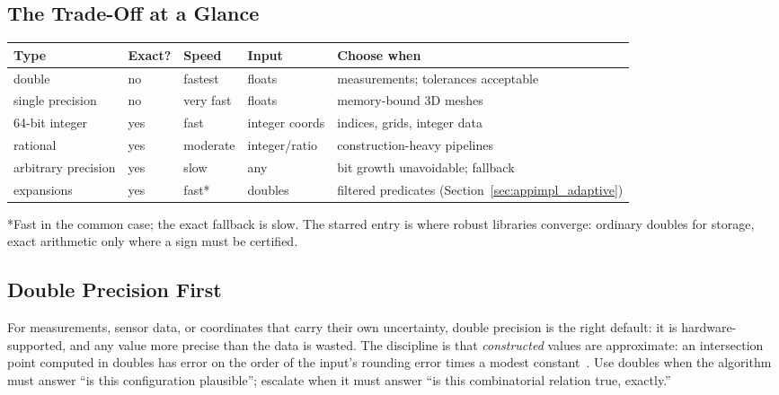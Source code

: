 \subsection{The Trade-Off at a Glance}
\label{sec:appimpl_representations}
\begin{center}
\begin{tabular}{p{3.2cm}p{2.2cm}p{2.2cm}p{3.0cm}p{4.0cm}}
\hline
\textbf{Type} & \textbf{Exact?} & \textbf{Speed} & \textbf{Input} & \textbf{Choose when} \\
\hline
\index{double precision}double & no & fastest & floats &
measurements; tolerances acceptable \\
single precision & no & very fast & floats & memory-bound 3D meshes \\
64-bit integer & yes & fast & integer coords & indices, grids, integer
data \\
\index{rational arithmetic}rational & yes & moderate & integer/ratio &
construction-heavy pipelines \\
arbitrary precision & yes & slow & any & bit growth unavoidable; fallback \\
\index{expansion arithmetic}expansions & yes & fast* & doubles &
filtered predicates (Section~\ref{sec:appimpl_adaptive}) \\
\hline
\end{tabular}
\end{center}

*Fast in the common case; the exact fallback is slow. The starred entry is
where robust libraries converge: ordinary doubles for storage, exact
arithmetic only where a sign must be certified.
\subsection{Double Precision First}
\label{sec:appimpl_double}
For measurements, sensor data, or coordinates that carry their own
uncertainty, double precision is the right default:
it is hardware-supported, and any value more precise than the data is
wasted. The discipline is that \emph{constructed} values are approximate:
an intersection point computed in doubles has error on the order of the
input's rounding error times a modest constant~\cite{higham2002,goldberg1991}.
Use doubles when the algorithm must answer ``is this configuration
plausible''; escalate when it must answer ``is this combinatorial relation
true, exactly.''
